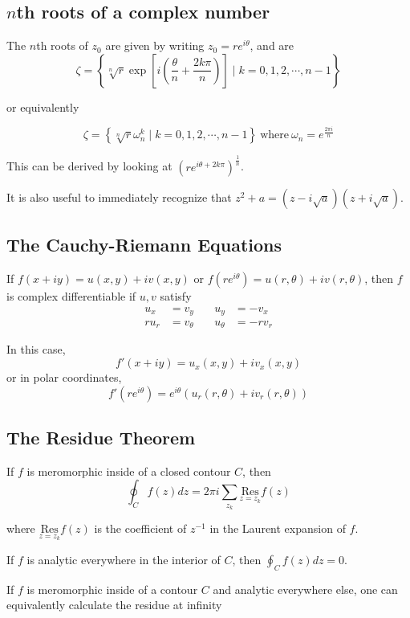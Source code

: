\documentclass{article}
\begin{document}
\subsection{$n$th roots of a complex number}
The $n$th roots of $z_0$ are given by writing $z_0 = re^{i\theta}$, and are 
\[\zeta = \left\{ \sqrt[n]{r} \exp\left[{i\left( \frac{\theta}{n} + \frac{2k\pi}{n}\right)}\right] \mid k = 0,1,2,\cdots, n-1\right\}\]

or equivalently

\[\zeta = \left\{ \sqrt[n]{r}\omega_n^k \mid k = 0,1,2,\cdots, n-1\right\}~\text{where}~\omega_n = e^{\frac{2\pi i}{n}}\]

This can be derived by looking at $\left( re^{i\theta + 2k\pi}\right)^{\frac{1}{n}}$.

It is also useful to immediately recognize that $z^2+a = (z-i\sqrt{a})(z+i\sqrt{a})$.

\subsection{The Cauchy-Riemann Equations}

If $f(x+iy) = u(x,y) + iv(x,y)$ or $f(re^{i\theta}) = u(r,\theta) + iv(r,\theta)$, then $f$ is complex differentiable if $u,v$ satisfy 
\begin{align*}
    u_x &= v_y &\quad u_y &= -v_x \\
    ru_r &= v_\theta &\quad u_\theta &= -rv_r
\end{align*}

In this case, 
\[
f'(x+iy) = u_x(x,y) + iv_x(x,y)
\] 
or in polar coordinates, 
\[
f'(re^{i\theta}) = e^{i\theta}(u_r(r,\theta) + iv_r(r,\theta))
\]

\subsection{The Residue Theorem}


If $f$ is meromorphic inside of a closed contour $C$, then
\[ 
\oint_C f(z) dz = 2\pi i \sum_{z_k} \underset{z=z_k}{\text{Res}} f(z)
\]

where $\underset{z=z_k}{\text{Res}} f(z)$ is the coefficient of $z^{-1}$ in the Laurent expansion of $f$.

If $f$ is analytic everywhere in the interior of $C$, then $\oint_C f(z) dz = 0$.


If $f$ is meromorphic inside of a contour $C$ and analytic everywhere else, one can equivalently calculate the residue at infinity
\end{document}
